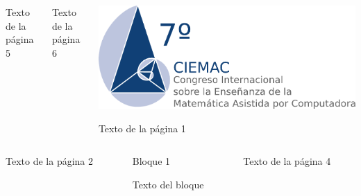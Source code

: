 \documentclass[11pt]{beamer}
\begin{document}
	\begin{frame}[fragile]{} 
		\begin{columns}[t]
			\begin{column}{0.33\textwidth}
			
				Texto de la p\'agina 5

			\end{column}
			
			\begin{column}{0.33\textwidth}
			
				Texto de la p\'agina 6
				
			\end{column}
			
			\begin{column}{0.33\textwidth}
				
				\includegraphics[scale=0.5]{LogoCIEMAC}
				
				Texto de la p\'agina 1
				
			\end{column}
		\end{columns}
	\end{frame}
	
	\begin{frame}[fragile]{} 
		\begin{columns}[t]
			\begin{column}{0.33\textwidth}
			
				Texto de la p\'agina 2

			\end{column}
			
			\begin{column}{0.33\textwidth}
			
				\begin{block}{Bloque 1}
				
					Texto del bloque	
	
				\end{block}
				
			\end{column}
			
			\begin{column}{0.33\textwidth}
				
				Texto de la p\'agina 4
				
			\end{column}
		\end{columns}
	\end{frame}
\end{document}
